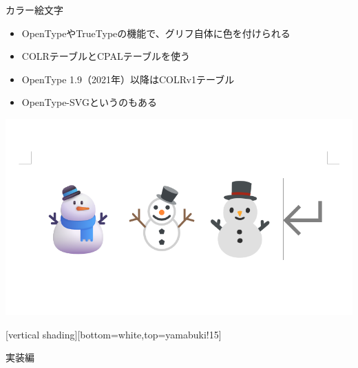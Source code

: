 \documentclass[unicode,14pt]{beamer}
\begin{document}
\begin{frame}[t]{カラー絵文字}
  \sffamily
  \begin{itemize}
\item OpenTypeやTrueTypeの機能で、グリフ自体に色を付けられる
\item COLRテーブルとCPALテーブルを使う
\item OpenType 1.9（2021年）以降はCOLRv1テーブル
\item OpenType-SVGというのもある
  \end{itemize}
  \begin{center}
    \includegraphics[width=.5\textwidth]{figures/emoji.png}
  \end{center}
\end{frame}

[vertical shading][bottom=white,top=yamabuki!15]

\begin{frame}[plain]
  \begin{center}
    \color{black}
    実装編
  \end{center}
\end{frame}
\end{document}
